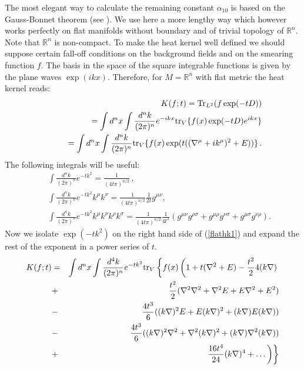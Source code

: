 The most elegant way to calculate the remaining constant $\alpha_{10}$
is based on the Gauss-Bonnet theorem 
(see \cite{Gilkey:1995}). We use here a more lengthy way 
\cite{Nepomechie:1985wt} which
however works perfectly on flat manifolds without boundary and
of trivial topology of $\mathbb{R}^n$. 
Note that $\mathbb{R}^n$ is non-compact.
To make
the heat kernel well defined we should suppose certain fall-off
conditions on the background fields and on the smearing function $f$.
The basis in the space of the square integrable
functions is given by the plane waves $\exp (ikx)$.
Therefore, for $M=\mathbb{R}^n$ with flat metric the heat kernel
reads:
\begin{eqnarray}
&&K(f;t)={\rm Tr}_{L^2} (f\exp (-tD))\nonumber \\
&&\qquad =\int d^nx \int 
\frac {d^nk}{(2\pi)^n} e^{-ikx}{\rm tr}_V \{f(x) \exp (-tD) e^{ikx}\}
\nonumber \\
&&\qquad =\int d^nx \int \frac {d^nk}{(2\pi)^n} {\rm tr}_V\{ f(x) 
\exp (t((\nabla^\mu +ik^\mu )^2+E))\} \,.
\label{flathk1}
\end{eqnarray}
The following integrals will be useful:
\begin{eqnarray}
&&\int \frac {d^nk}{(2\pi)^n} e^{-tk^2} =\frac 1{(4t\pi)^{n/2}}
\, , \nonumber \\
&&\int \frac {d^nk}{(2\pi)^{n}}  e^{-tk^2} k^\mu k^\nu
=\frac 1{(4t\pi)^{n/2}}\frac 1{2t} g^{\mu \nu} , \nonumber \\
&&\int \frac {d^nk}{(2\pi)^n} e^{-tk^2}  k^\mu k^\nu k^\rho k^\sigma
=\frac 1{(4t\pi)^{n/2}} \frac 1{4t^2} (g^{\mu\nu}g^{\rho \sigma}+
g^{\mu\rho}g^{\nu\sigma}+g^{\mu\sigma}g^{\nu\rho} ) .\label{eq:ex2}
\end{eqnarray}
Now we isolate $\exp (-tk^2)$ on the right hand side of (\ref{flathk1})
and expand the rest of the exponent in a power series of $t$.
\begin{eqnarray}
K(f;t) &=&\int d^nx \int \frac {d^4k}{(2\pi)^n} e^{-tk^2}
{\rm tr}_V \left\{ f(x)\left( 1+t(\nabla^2 +E)
-\frac {t^2}2 4(k\nabla ) \right. \right. \nonumber \\
&+& \frac {t^2}2 (\nabla^2 \nabla^2 +\nabla^2 E +E\nabla^2 +E^2)
\nonumber \\
&-& \frac {4t^3}6 ((k\nabla )^2E+E(k\nabla )^2 +(k\nabla )E(k\nabla ))
\nonumber \\
&-& \frac {4t^3}6
((k\nabla )^2\nabla^2+\nabla^2(k\nabla )^2 +(k\nabla )\nabla^2(k\nabla ))
\nonumber \\
&+&\left. \left. \frac {16t^4}{24} (k\nabla )^4 +\dots \right) \right\}
\end{eqnarray}
